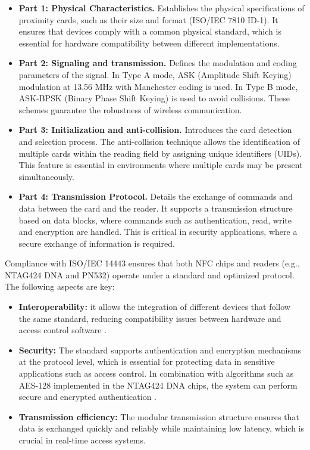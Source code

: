 \begin{itemize}
	\item \textbf{Part 1: Physical Characteristics.} Establishes the physical specifications of proximity cards, such as their size and format (ISO/IEC 7810 ID-1). It ensures that devices comply with a common physical standard, which is essential for hardware compatibility between different implementations.
	
	\item \textbf{Part 2: Signaling and transmission.} Defines the modulation and coding parameters of the signal. In Type A mode, ASK (Amplitude Shift Keying) modulation at 13.56 MHz with Manchester coding is used. In Type B mode, ASK-BPSK (Binary Phase Shift Keying) is used to avoid collisions. These schemes guarantee the robustness of wireless communication.
	
	\item \textbf{Part 3: Initialization and anti-collision.} Introduces the card detection and selection process. The anti-collision technique allows the identification of multiple cards within the reading field by assigning unique identifiers (UIDs). This feature is essential in environments where multiple cards may be present simultaneously.
	
	\item \textbf{Part 4: Transmission Protocol.} Details the exchange of commands and data between the card and the reader. It supports a transmission structure based on data blocks, where commands such as authentication, read, write and encryption are handled. This is critical in security applications, where a secure exchange of information is required.
\end{itemize}

Compliance with ISO/IEC 14443 ensures that both NFC chips and readers (e.g., NTAG424 DNA and PN532) operate under a standard and optimized protocol. The following aspects are key:

\begin{itemize}
	\item \textbf{Interoperability:} it allows the integration of different devices that follow the same standard, reducing compatibility issues between hardware and access control software \cite{ref66}.
	
	\item \textbf{Security:} The standard supports authentication and encryption mechanisms at the protocol level, which is essential for protecting data in sensitive applications such as access control. In combination with algorithms such as AES-128 implemented in the NTAG424 DNA chips, the system can perform secure and encrypted authentication \cite{ref67}.
	
	\item \textbf{Transmission efficiency:} The modular transmission structure ensures that data is exchanged quickly and reliably while maintaining low latency, which is crucial in real-time access systems.
\end{itemize}

